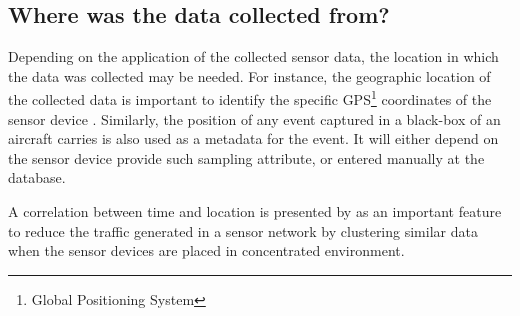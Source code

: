 \subsection{Where was the data collected from?}

Depending on the application of the collected sensor data, the location in
which the data was collected may be needed. For instance, the geographic
location of the collected data is important to identify the specific
GPS\footnote{Global Positioning System} coordinates of the sensor device
\cite{sn-ex02}. Similarly, the position of any event captured in a black-box of
an aircraft carries is also used as a metadata for the event. It will either
depend on the sensor device provide such sampling attribute, or entered
manually at the database.

A correlation between time and location is presented by \cite{sn-time-series}
as an important feature to reduce the traffic generated in a sensor network by
clustering similar data when the sensor devices are placed in concentrated
environment.